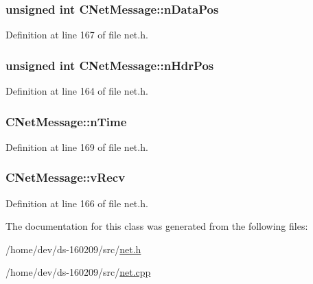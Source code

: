 \subsubsection[{n\+Data\+Pos}]{\setlength{\rightskip}{0pt plus 5cm}unsigned int C\+Net\+Message\+::n\+Data\+Pos}\label{class_c_net_message_a418f59287d1805dda6959f27a170c855}


Definition at line 167 of file net.\+h.

\hypertarget{class_c_net_message_a1a500121037490eec4b238906f3a23ad}{}
\subsubsection[{n\+Hdr\+Pos}]{\setlength{\rightskip}{0pt plus 5cm}unsigned int C\+Net\+Message\+::n\+Hdr\+Pos}\label{class_c_net_message_a1a500121037490eec4b238906f3a23ad}


Definition at line 164 of file net.\+h.

\hypertarget{class_c_net_message_a99d5bbca862ac4b7a88b71a7b679decc}{}
\subsubsection[{n\+Time}]{ C\+Net\+Message\+::n\+Time}\label{class_c_net_message_a99d5bbca862ac4b7a88b71a7b679decc}


Definition at line 169 of file net.\+h.

\hypertarget{class_c_net_message_a1a25c16099d01362e1663390a2e06d1a}{}
\subsubsection[{v\+Recv}]{ C\+Net\+Message\+::v\+Recv}\label{class_c_net_message_a1a25c16099d01362e1663390a2e06d1a}


Definition at line 166 of file net.\+h.



The documentation for this class was generated from the following files\+:\begin{DoxyCompactItemize}
\item 
/home/dev/ds-\/160209/src/\hyperlink{net_8h}{net.\+h}\item 
/home/dev/ds-\/160209/src/\hyperlink{net_8cpp}{net.\+cpp}\end{DoxyCompactItemize}
